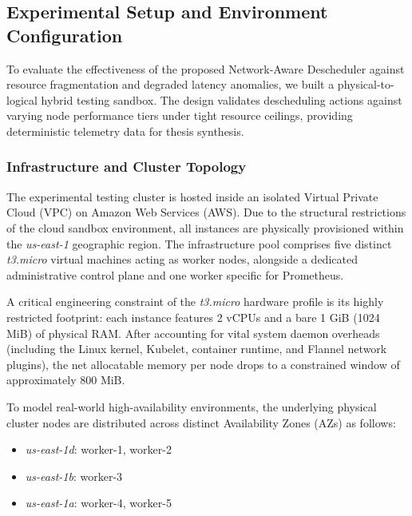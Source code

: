 \subsection{Experimental Setup and Environment Configuration}
\label{subsec:netaware4_experimentsetup}
To evaluate the effectiveness of the proposed Network-Aware Descheduler against resource fragmentation and degraded latency anomalies, we built a physical-to-logical hybrid testing sandbox. The design validates descheduling actions against varying node performance tiers under tight resource ceilings, providing deterministic telemetry data for thesis synthesis.

\subsubsection{Infrastructure and Cluster Topology}
\label{subsubsec:netaware4_infrasetup}
The experimental testing cluster is hosted inside an isolated Virtual Private Cloud (VPC) on Amazon Web Services (AWS). Due to the structural restrictions of the cloud sandbox environment, all instances are physically provisioned within the \textit{us-east-1} geographic region. The infrastructure pool comprises five distinct \textit{t3.micro} virtual machines acting as worker nodes, alongside a dedicated administrative control plane and one worker specific for Prometheus.

A critical engineering constraint of the \textit{t3.micro} hardware profile is its highly restricted footprint: each instance features 2 vCPUs and a bare 1 GiB (1024 MiB) of physical RAM. After accounting for vital system daemon overheads (including the Linux kernel, Kubelet, container runtime, and Flannel network plugins), the net allocatable memory per node drops to a constrained window of approximately 800 MiB.

To model real-world high-availability environments, the underlying physical cluster nodes are distributed across distinct Availability Zones (AZs) as follows:

\begin{itemize}
    \item \textit{us-east-1d}: worker-1, worker-2
    \item \textit{us-east-1b}: worker-3
    \item \textit{us-east-1a}: worker-4, worker-5
\end{itemize}


